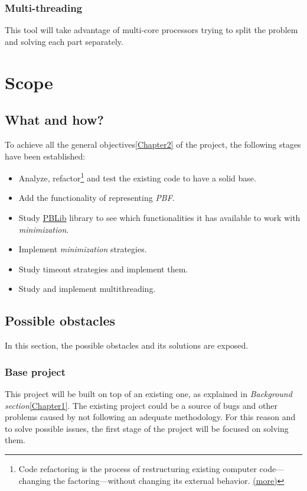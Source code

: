\subsubsection{Multi-threading}
This tool will take advantage of multi-core processors trying to split the problem and solving each part separately.

\section{Scope}
\subsection{What and how?}

To achieve all the general objectives\ref{Chapter2} of the project, the following stages have been established:
\begin{itemize}
	\item Analyze, refactor\footnote{Code refactoring is the process of restructuring existing computer code—changing the factoring—without changing its external behavior. \href{https://en.wikipedia.org/wiki/Code_refactoring}{(more)}} and test the existing code to have a solid base. 
	\item Add the functionality of representing \emph{PBF}.
	\item Study \href{http://tools.computational-logic.org/content/pblib.php}{PBLib} library to see which functionalities it has available to work with \emph{minimization}.
	\item Implement \emph{minimization} strategies.
	\item Study timeout strategies and implement them.
	\item Study and implement multithreading.
\end{itemize}

\subsection{Possible obstacles}

In this section, the possible obstacles and its solutions are exposed.

\subsubsection{Base project}
This project will be built on top of an existing one, as explained in \emph{Background section}\ref{Chapter1}. The existing project could be a source of bugs and other problems caused by not following an adequate methodology. For this reason and to solve possible issues, the first stage of the project will be focused on solving them.
